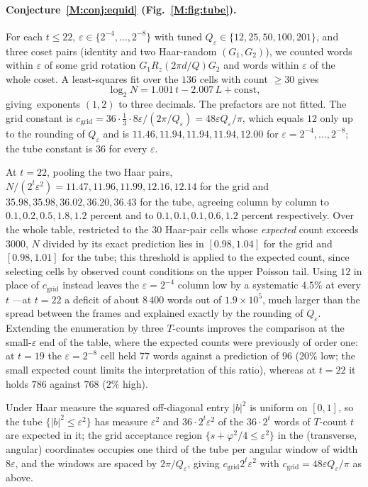 \documentclass[aps,prx,twocolumn,superscriptaddress,nofootinbib,longbibliography]{revtex4-2}
\theoremstyle{plain}
\theoremstyle{definition}
\theoremstyle{remark}
\begin{document}
\paragraph{Conjecture~\ref{M:conj:equid} (Fig.~\ref{M:fig:tube}).} For each $t\le22$, $\varepsilon\in\{2^{-4},\dots,2^{-8}\}$ with tuned $Q_\varepsilon\in\{12,25,50,100,201\}$, and three coset pairs (identity and two Haar-random $(G_1,G_2)$), we counted words within $\varepsilon$ of some grid rotation $G_1R_z(2\pi d/Q)G_2$ and words within $\varepsilon$ of the whole coset. A least-squares fit over the $136$ cells with count $\ge30$ gives
\begin{equation}
\log_2N=1.001\,t-2.007\,L+\text{const},
\end{equation}
giving\ exponents $(1,2)$ to three decimals. The prefactors are not fitted. The grid constant is $c_{\mathrm{grid}}=36\cdot\tfrac13\cdot8\varepsilon/(2\pi/Q_\varepsilon)=48\varepsilon Q_\varepsilon/\pi$, which equals $12$ only up to the rounding of $Q_\varepsilon$ and is $11.46,11.94,11.94,11.94,12.00$ for $\varepsilon=2^{-4},\dots,2^{-8}$; the tube constant is $36$ for every $\varepsilon$. 

At $t=22$, pooling the two Haar pairs, $N/(2^t\varepsilon^2)=11.47,11.96,11.99,12.16,12.14$ for the grid and $35.98,35.98,36.02,36.20,36.43$ for the tube, agreeing column by column to $0.1,0.2,0.5,1.8,1.2$ percent and to $0.1,0.1,0.1,0.6,1.2$ percent respectively. Over the whole table, restricted to the $30$ Haar-pair cells whose \emph{expected} count exceeds $3000$, $N$ divided by its exact prediction lies in $[0.98,1.04]$ for the grid and $[0.98,1.01]$ for the tube; this threshold is applied to the expected count, since selecting cells by observed count conditions on the upper Poisson tail. Using $12$ in place of $c_{\mathrm{grid}}$ instead leaves the $\varepsilon=2^{-4}$ column low by a systematic $4.5\%$ at every $t$ ---at $t=22$ a deficit of about $8\,400$ words out of $1.9\times10^5$, much larger than the spread between the frames and explained exactly by the rounding of $Q_\varepsilon$. Extending the enumeration by three $T$-counts improves the comparison at the small-$\varepsilon$ end of the table, where the expected counts were previously of order one: at $t=19$ the $\varepsilon=2^{-8}$ cell held $77$ words against a prediction of $96$ ($20\%$ low; the small expected count limits the interpretation of this ratio), whereas at $t=22$ it holds $786$ against $768$ ($2\%$ high). 

Under Haar measure the squared off-diagonal entry $|b|^2$ is uniform on $[0,1]$, so the tube $\{|b|^2\le\varepsilon^2\}$ has measure $\varepsilon^2$ and $36\cdot2^t\varepsilon^2$ of the $36\cdot2^t$ words of $T$-count $t$ are expected in it; the grid acceptance region $\{s+\varphi^2/4\le\varepsilon^2\}$ in the (transverse, angular) coordinates occupies one third of the tube per angular window of width $8\varepsilon$, and the windows are spaced by $2\pi/Q_\varepsilon$, giving $c_{\mathrm{grid}}2^t\varepsilon^2$ with $c_{\mathrm{grid}}=48\varepsilon Q_\varepsilon/\pi$ as above. 
\end{document}
